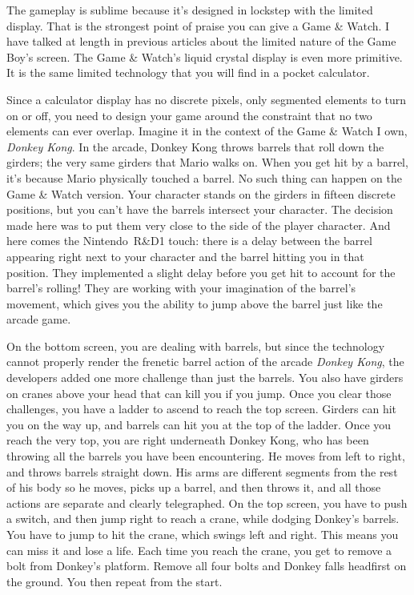 \documentclass{book}
\begin{document}
The gameplay is sublime because it’s designed in lockstep with the limited display. That is the strongest point of praise you can give a Game \& Watch. I have talked at length in previous articles about the limited nature of the Game Boy’s screen. The Game \& Watch’s liquid crystal display is even more primitive. It is the same limited technology that you will find in a pocket calculator.

Since a calculator display has no discrete pixels, only segmented elements to turn on or off, you need to design your game around the constraint that no two elements can ever overlap. Imagine it in the context of the Game \& Watch I own, \emph{Donkey Kong}. In the arcade, Donkey Kong throws barrels that roll down the girders; the very same girders that Mario walks on. When you get hit by a barrel, it’s because Mario physically touched a barrel. No such thing can happen on the Game \& Watch version. Your character stands on the girders in fifteen discrete positions, but you can’t have the barrels intersect your character. The decision made here was to put them very close to the side of the player character. And here comes the Nintendo R\&D1 touch: there is a delay between the barrel appearing right next to your character and the barrel hitting you in that position. They implemented a slight delay before you get hit to account for the barrel’s rolling! They are working with your imagination of the barrel’s movement, which gives you the ability to jump above the barrel just like the arcade game.

On the bottom screen, you are dealing with barrels, but since the technology cannot properly render the frenetic barrel action of the arcade \emph{Donkey Kong}, the developers added one more challenge than just the barrels. You also have girders on cranes above your head that can kill you if you jump. Once you clear those challenges, you have a ladder to ascend to reach the top screen. Girders can hit you on the way up, and barrels can hit you at the top of the ladder. Once you reach the very top, you are right underneath Donkey Kong, who has been throwing all the barrels you have been encountering. He moves from left to right, and throws barrels straight down. His arms are different segments from the rest of his body so he moves, picks up a barrel, and then throws it, and all those actions are separate and clearly telegraphed. On the top screen, you have to push a switch, and then jump right to reach a crane, while dodging Donkey’s barrels. You have to jump to hit the crane, which swings left and right. This means you can miss it and lose a life. Each time you reach the crane, you get to remove a bolt from Donkey’s platform. Remove all four bolts and Donkey falls headfirst on the ground. You then repeat from the start.
\end{document}
